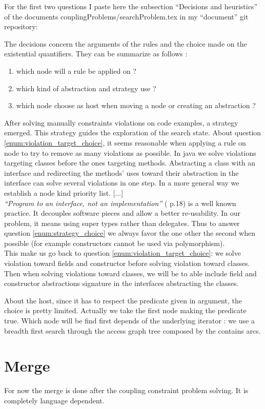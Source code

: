 \documentclass[]{article}
\begin{document}
For the first two questions I paste here the subsection ``Decisions and heuristics'' of the documents couplingProblems/searchProblem.tex in my ``document'' git repository:


\begin{framed}

The decisions concern the arguments of the rules and the choice made on the existential quantifiers. They can be summarize as follows :
\begin{enumerate}
\item \label{enum:violation_target_choice} which node will a rule be applied on ?
\item \label{enum:strategy_choice} which kind of abstraction and strategy use ?
\item \label{enum:host_choice} which node choose as host when moving a node or creating an abstraction ?
\end{enumerate}

After solving manually constraints violations on code examples, a strategy emerged. This strategy guides the exploration of the search state. About question \ref{enum:violation_target_choice}, it seems reasonable when applying a rule on node to try to remove as many violations as possible. In java we solve violations targeting classes before the ones targeting methods. Abstracting a class with an interface and redirecting the methods' uses toward their abstraction in the interface can solve several violations in one step. 
In a more general way we establish a node kind priority list.
[...]\\
\emph{``Program to an interface, not an implementation''} (\cite{gamma1993gof} p.18) is a well known practice. It decouples software pieces and allow a better re-usability. In our problem, it means using super types rather than delegates. Thus to answer question \ref{enum:strategy_choice} we always favor the one other the second when possible (for example constructors cannot be used via polymorphism). \\
This make us go back to question \ref{enum:violation_target_choice}: we solve violation toward fields and constructor before solving violation toward classes. Then when solving violations toward classes, we will be to able include field and constructor abstractions signature in the interfaces abstracting the classes.
\end{framed}

About the host, since it has to respect the predicate given in argument, the choice is pretty limited. Actually we take the first node making the predicate true. Which node will be find first depends of the underlying iterator : we use a breadth first search through the access graph tree composed by the contains arcs.

\section{Merge}
For now the merge is done after the coupling constraint problem solving. It is completely language dependent.




\end{document}
